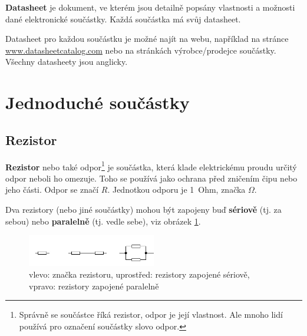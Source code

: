 
\label{elektronika}


{\bf Datasheet}  je dokument, ve kterém jsou detailně popsány vlastnosti a možnosti dané elektronické součástky.
Každá součástka má svůj datasheet. 

Datasheet pro každou součástku je možné najít na webu, například na stránce \url{www.datasheetcatalog.com}
nebo na stránkách výrobce/prodejce součástky. 
Všechny datasheety jsou anglicky.  


\section{Jednoduché součástky} 


\subsection{Rezistor} \label{rezistor}

{\bf Rezistor}   nebo také odpor\footnote{Správně se součástce říká rezistor, odpor je její vlastnost.
	 Ale mnoho lidí používá pro označení součástky slovo odpor.} je součástka, která klade elektrickému proudu  určitý odpor neboli ho omezuje. 
	Toho se používá jako ochrana před zničením čipu nebo jeho části. Odpor se značí $R$. Jednotkou odporu je 1~Ohm, značka $\Omega$. 

 Dva rezistory (nebo jiné součástky) mohou být zapojeny buď 
 {\bf sériově}  \label{seriove}
 (tj. za sebou) nebo {\bf paralelně} (tj. vedle sebe), viz obrázek \ref{fig:rezistory}. 

\begin{figure}[h]
	\begin{center}
	\includegraphics[width=0.5\textwidth]{soubory/rezistory.jpg}		
	\end{center}
	\caption{ vlevo: značka rezistoru, uprostřed: rezistory zapojené sériově, vpravo: rezistory zapojené paralelně} 
	\label{fig:rezistory}
\end{figure}

